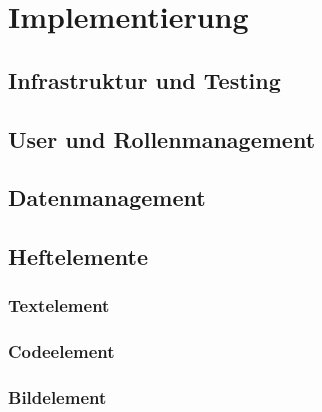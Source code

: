 \documentclass[12pt]{article}
\begin{document}
\newpage %

\section{Implementierung}
\label{sec:implementierung}


\subsection{Infrastruktur und Testing}
\label{subsec:infrastrukturtesting}


\newpage

\subsection{User und Rollenmanagement}
\label{subsec:usermanagement}


\newpage

\subsection{Datenmanagement}
\label{subsec:datenmanagement}


\newpage

\subsection{Heftelemente}
\label{subsec:heftelement}


\subsubsection{Textelement}
\label{subsubsec:textelement}


\newpage

\subsubsection{Codeelement}
\label{subsubsec:codeelement}


\newpage

\subsubsection{Bildelement}
\label{subsubsec:bildelement}

\end{document}
